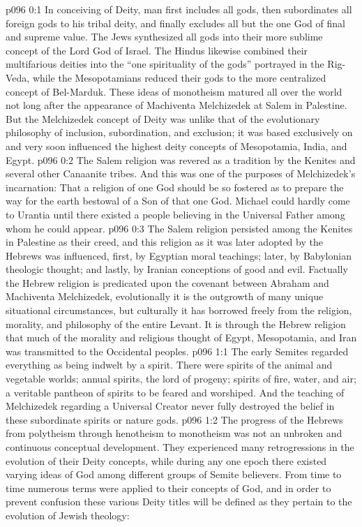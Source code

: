 \author{Melchizedek}
\vs p096 0:1 In conceiving of Deity, man first includes all gods, then subordinates all foreign gods to his tribal deity, and finally excludes all but the one God of final and supreme value. The Jews synthesized all gods into their more sublime concept of the Lord God of Israel. The Hindus likewise combined their multifarious deities into the “one spirituality of the gods” portrayed in the Rig\hyp{}Veda, while the Mesopotamians reduced their gods to the more centralized concept of Bel\hyp{}Marduk. These ideas of monotheism matured all over the world not long after the appearance of Machiventa Melchizedek at Salem in Palestine. But the Melchizedek concept of Deity was unlike that of the evolutionary philosophy of inclusion, subordination, and exclusion; it was based exclusively on  and very soon influenced the highest deity concepts of Mesopotamia, India, and Egypt.
\pc \vs p096 0:2 The Salem religion was revered as a tradition by the Kenites and several other Canaanite tribes. And this was one of the purposes of Melchizedek’s incarnation: That a religion of one God should be so fostered as to prepare the way for the earth bestowal of a Son of that one God. Michael could hardly come to Urantia until there existed a people believing in the Universal Father among whom he could appear.
\vs p096 0:3 The Salem religion persisted among the Kenites in Palestine as their creed, and this religion as it was later adopted by the Hebrews was influenced, first, by Egyptian moral teachings; later, by Babylonian theologic thought; and lastly, by Iranian conceptions of good and evil. Factually the Hebrew religion is predicated upon the covenant between Abraham and Machiventa Melchizedek, evolutionally it is the outgrowth of many unique situational circumstances, but culturally it has borrowed freely from the religion, morality, and philosophy of the entire Levant. It is through the Hebrew religion that much of the morality and religious thought of Egypt, Mesopotamia, and Iran was transmitted to the Occidental peoples.
\vs p096 1:1 The early Semites regarded everything as being indwelt by a spirit. There were spirits of the animal and vegetable worlds; annual spirits, the lord of progeny; spirits of fire, water, and air; a veritable pantheon of spirits to be feared and worshiped. And the teaching of Melchizedek regarding a Universal Creator never fully destroyed the belief in these subordinate spirits or nature gods.
\vs p096 1:2 The progress of the Hebrews from polytheism through henotheism to monotheism was not an unbroken and continuous conceptual development. They experienced many retrogressions in the evolution of their Deity concepts, while during any one epoch there existed varying ideas of God among different groups of Semite believers. From time to time numerous terms were applied to their concepts of God, and in order to prevent confusion these various Deity titles will be defined as they pertain to the evolution of Jewish theology:
